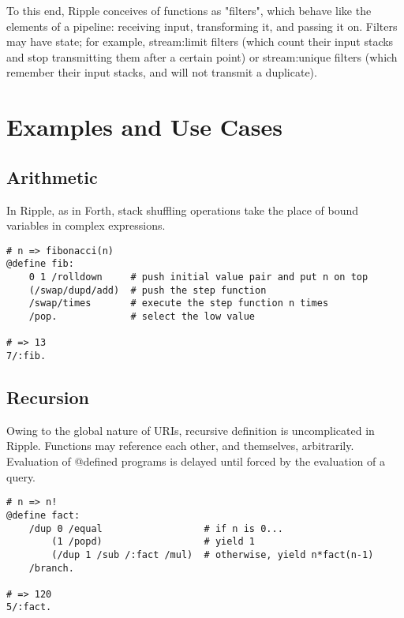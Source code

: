 \documentclass[runningheads]{llncs}
\begin{document}
To this end, Ripple conceives of functions as "filters", which behave like the elements of a pipeline: receiving input, transforming it, and passing it on.  Filters may have state; for example, stream:limit filters (which count their input stacks and stop transmitting them after a certain point) or stream:unique filters (which remember their input stacks, and will not transmit a duplicate).


\section{Examples and Use Cases}

\subsection{Arithmetic}
In Ripple, as in Forth, stack shuffling operations take the place of bound variables in complex expressions.
\begin{verbatim}
# n => fibonacci(n)
@define fib:
    0 1 /rolldown     # push initial value pair and put n on top
    (/swap/dupd/add)  # push the step function
    /swap/times       # execute the step function n times
    /pop.             # select the low value

# => 13
7/:fib.
\end{verbatim}


\subsection{Recursion}
Owing to the global nature of URIs, recursive definition is uncomplicated in Ripple.  Functions may reference each other, and themselves, arbitrarily.  Evaluation of @defined programs is delayed until forced by the evaluation of a query.
\begin{verbatim}
# n => n!
@define fact:
    /dup 0 /equal                  # if n is 0...
        (1 /popd)                  # yield 1
        (/dup 1 /sub /:fact /mul)  # otherwise, yield n*fact(n-1)
    /branch.

# => 120
5/:fact.
\end{verbatim}
\end{document}
